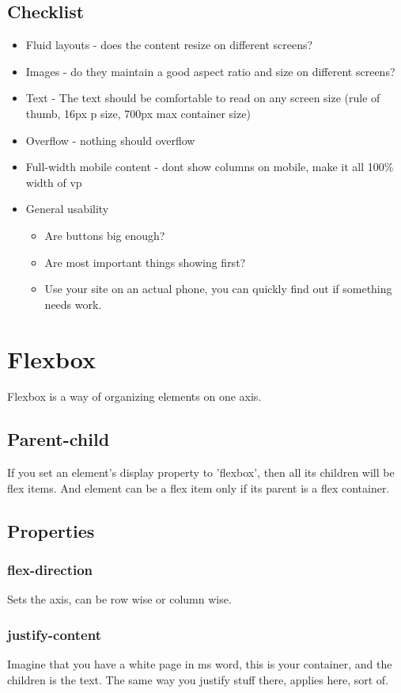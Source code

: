 \documentclass[11pt]{article}
\begin{document}
\subsection{Checklist}
\label{sec:org53bd976}
\begin{itemize}
\item Fluid layouts - does the content resize on different screens?
\item Images - do they maintain a good aspect ratio and size on different screens?
\item Text - The text should be comfortable to read on any screen size (rule of thumb, 16px p size, 700px max container size)
\item Overflow - nothing should overflow
\item Full-width mobile content - dont show columns on mobile, make it all 100\% width of vp
\item General usability
\begin{itemize}
\item Are buttons big enough?
\item Are most important things showing first?
\item Use your site on an actual phone, you can quickly find out if something needs work.
\end{itemize}
\end{itemize}
\section{Flexbox}
\label{sec:org78ace2f}
Flexbox is a way of organizing elements on one axis.
\subsection{Parent-child}
\label{sec:org8c56001}
If you set an element's display property to 'flexbox', then all its children will be flex items. And element can be a flex item only if its parent is a flex container.
\subsection{Properties}
\label{sec:orgb6ab184}
\subsubsection{flex-direction}
\label{sec:org330c4a9}
Sets the axis, can be row wise or column wise.
\subsubsection{justify-content}
\label{sec:orgd77a9fa}
Imagine that you have a white page in ms word, this is your container, and the children is the text. The same way you justify stuff there, applies here, sort of.
\end{document}
